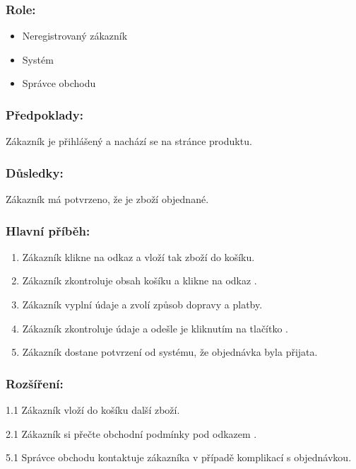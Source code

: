 \documentclass[11pt,twoside,a4paper]{book}
\begin{document}
\subsubsection*{Role:}

\begin{itemize}
\item Neregistrovaný zákazník
\item Systém
\item Správce obchodu
\end{itemize}

\subsubsection*{Předpoklady:}

Zákazník je přihlášený a nachází se na stránce produktu.


\subsubsection*{Důsledky:}

Zákazník má potvrzeno, že je zboží objednané.

\subsubsection*{Hlavní příběh:}

\begin{enumerate}
\item Zákazník klikne na odkaz  a vloží tak zboží do košíku.
\item Zákazník zkontroluje obsah košíku a klikne na odkaz .
\item Zákazník vyplní údaje a zvolí způsob dopravy a platby.
\item Zákazník zkontroluje údaje a odešle je kliknutím na tlačítko .
\item Zákazník dostane potvrzení od systému, že objednávka byla přijata.
\end{enumerate}

\subsubsection*{Rozšíření:}

\begin{description}
\item 1.1 Zákazník vloží do košíku další zboží.
\item 2.1 Zákazník si přečte obchodní podmínky pod odkazem .
\item 5.1 Správce obchodu kontaktuje zákazníka v případě komplikací s objednávkou.
\end{description}
\end{document}
